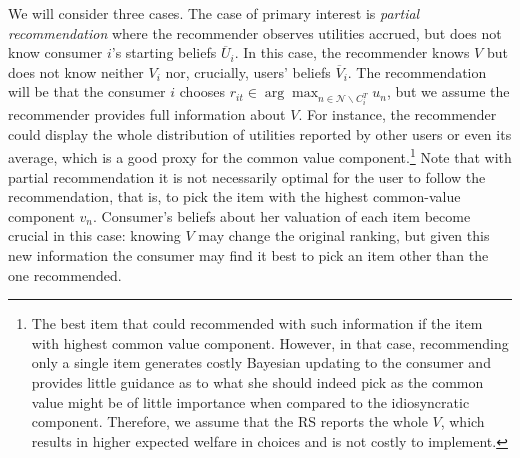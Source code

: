 \documentclass[sigconf]{acmart}
\begin{document}
We will consider three cases. The case of primary interest is \textit{partial recommendation} where the recommender observes utilities accrued, but does not know consumer $i$'s starting beliefs $\overline U_i$. In this case, the recommender knows $V$ but does not know neither $V_i$ nor, crucially, users' beliefs $\overline V_i$. The recommendation will be that the consumer $i$ chooses $r_{it} \in \arg \max_{n \in \mathcal{N} \backslash C_i^T} u_n$, but we assume the recommender provides full information about $V$. For instance, the recommender could display the whole distribution of utilities reported by other users or even its average, which is a good proxy for the common value component.\footnote{
The best item that could recommended with such information if the item with highest common value component. However, in that case, recommending only a single item generates costly Bayesian updating to the consumer and provides little guidance as to what she should indeed pick as the common value might be of little importance when compared to the idiosyncratic component. Therefore, we assume that the RS reports the whole $V$, which results in higher expected welfare in choices and is not costly to implement.
}
Note that with partial recommendation it is not necessarily optimal for the user to follow the recommendation, that is, to pick the item with the highest common-value component $v_n$. Consumer's beliefs about her valuation of each item become crucial in this case: knowing $V$ may change the original ranking, but given this new information the consumer may find it best to pick an item other than the one recommended.
\end{document}
